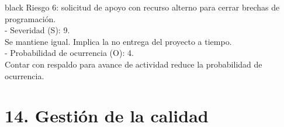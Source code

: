 \documentclass[
11pt, %
codirector, %
]{charter}
\begin{document}
\begin{consigna}{black}
Riesgo 6: solicitud de apoyo con recurso alterno para cerrar brechas de programación. \\ 
  - Severidad (S): 9. \\
	Se mantiene igual. Implica la no entrega del proyecto a tiempo. \\
  - Probabilidad de ocurrencia (O): 4. \\
	Contar con respaldo para avance de actividad reduce la probabilidad de ocurrencia. \\

\end{consigna}


\section{14. Gestión de la calidad}
\label{sec:calidad}
\end{document}
